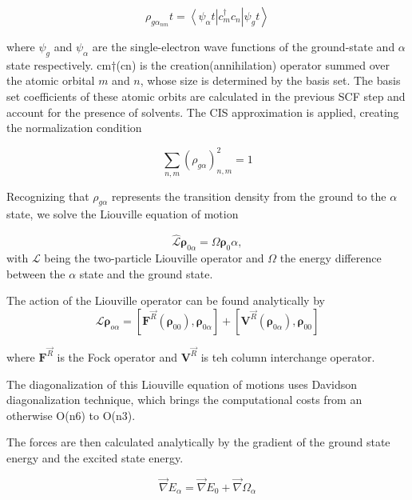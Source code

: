     \begin{equation}
	\rho_{g\alpha_{nm}}t = \left< \psi_\alpha t \right| c_m^\dagger c_n \left | \psi_g t \right>
    \end{equation}

    where \(\psi_g\) and \(\psi_\alpha\) are the single-electron wave functions of the ground-state and \(\alpha\) state respectively.
    cm†(cn) is the creation(annihilation) operator summed over the atomic orbital \(m\) and \(n\), whose size is determined by the basis set.
    The basis set coefficients of these atomic orbits are calculated in the previous SCF step and account for the presence of solvents.
    The CIS approximation is applied, creating the normalization condition 

    \begin{equation}
	\sum_{n,m} (\rho_{g\alpha})^2_{n,m} = 1
    \end{equation}

    Recognizing that \(\rho_{g\alpha}\) represents the transition density from the ground to the \(\alpha\) state, we solve the Liouville equation of motion 

    \begin{equation}
	\hat{\mathcal{L}}\bm{\rho}_{0\alpha} = \Omega \bm{\rho}_0\alpha,
    \end{equation}
    with \(\mathcal{L}\) being the two-particle Liouville operator and \(\Omega\) the energy difference between the \(\alpha\) state and the ground state.

    The action of the Liouville operator can be found analytically by
    \begin{equation}
    \mathcal{L} \bm{\rho}_{o\alpha} = \left[ \bm{F}^{\vec{R}} (\bm{\rho}_{00}),\bm{\rho}_{0\alpha} \right] +
    \left[ \bm{V}^{\vec{R}} (\bm{\rho}_{0\alpha}), \bm{\rho}_{00} \right]
    \end{equation}

    where \(\bm{F}^{\vec{R}}\) is the Fock operator and \(\bm{V}^{\vec{R}}\) is teh column interchange operator.

    The diagonalization of this Liouville equation of motions uses Davidson diagonalization technique, which brings the computational costs from an otherwise O(n6) to O(n3). 

    The forces are then calculated analytically by the gradient of the ground state energy and the excited state energy. 

    \begin{equation}
    \vec{\nabla} E_\alpha = \vec{\nabla} E_0 + \vec{\nabla}\Omega_\alpha
    \end{equation}

